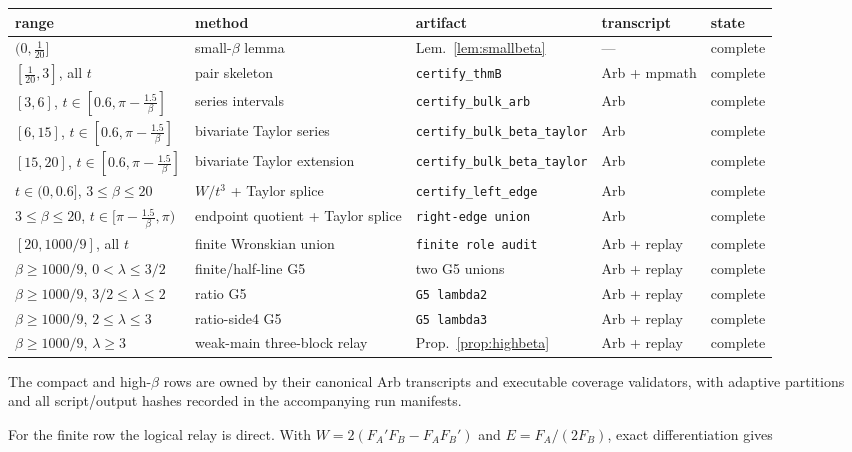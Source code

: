 \documentclass[11pt]{article}
\theoremstyle{remark}
\newcommand{\FA}{F_{\!A}}
\newcommand{\FB}{F_{\!B}}
\begin{document}
\begin{center}\scriptsize
\begin{tabular}{@{}p{}p{}p{}
p{}p{}@{}}
\toprule
range & method & artifact & transcript & state\\
\midrule
$(0,\tfrac1{20}]$ & small-$\beta$ lemma & Lem.~\ref{lem:smallbeta} & --- & complete\\
$[\tfrac1{20},3]$, all $t$ & pair skeleton & \texttt{certify\_thmB} & Arb + mpmath & complete\\
$[3,6]$, $t{\in}[0.6,\pi{-}\tfrac{1.5}{\beta}]$ & series intervals & \texttt{certify\_bulk\_arb} & Arb & complete\\
$[6,15]$, $t{\in}[0.6,\pi{-}\tfrac{1.5}{\beta}]$ & bivariate Taylor series & \texttt{certify\_bulk\_beta\_taylor} & Arb & complete\\
$[15,20]$, $t{\in}[0.6,\pi{-}\tfrac{1.5}{\beta}]$ & bivariate Taylor extension & \texttt{certify\_bulk\_beta\_taylor} & Arb & complete\\
$t\in(0,0.6]$, $3\le\beta\le20$ & $W/t^3$ + Taylor splice & \texttt{certify\_left\_edge} & Arb & complete\\
$3\le\beta\le20$, $t\in[\pi{-}\tfrac{1.5}{\beta},\pi)$ & endpoint quotient + Taylor splice & \texttt{right-edge union} & Arb & complete\\
$[20,1000/9]$, all $t$ & finite Wronskian union & \texttt{finite role audit} & Arb + replay & complete\\
$\beta\ge1000/9$, $0<\lambda\le3/2$ & finite/half-line G5 & two G5 unions & Arb + replay & complete\\
$\beta\ge1000/9$, $3/2\le\lambda\le2$ & ratio G5 & \texttt{G5 lambda2} & Arb + replay & complete\\
$\beta\ge1000/9$, $2\le\lambda\le3$ & ratio-side4 G5 & \texttt{G5 lambda3} & Arb + replay & complete\\
$\beta\ge1000/9$, $\lambda\ge3$ & weak-main three-block relay & Prop.~\ref{prop:highbeta} & Arb + replay & complete\\
\bottomrule
\end{tabular}
\end{center}

The compact and high-$\beta$ rows are owned by their canonical Arb transcripts and
executable coverage validators, with adaptive partitions and all
script/output hashes recorded in the accompanying run manifests.

For the finite row the logical relay is direct.  With
$W=2(\FA'\FB-\FA\FB')$ and $E=\FA/(2\FB)$, exact differentiation gives
\end{document}
